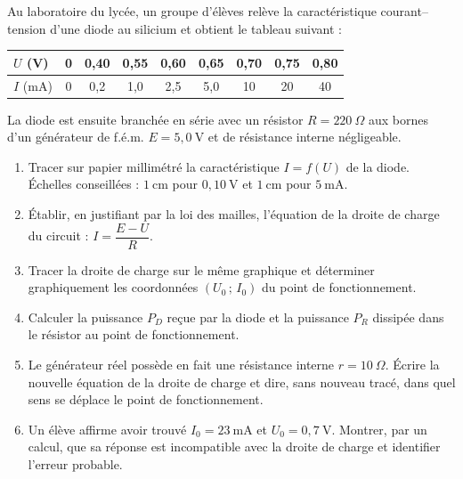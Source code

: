 \documentclass[11pt]{article}
\begin{document}
\begin{exercice}
Au laboratoire du lycée, un groupe d'élèves relève la caractéristique courant--tension d'une diode au silicium et obtient le tableau suivant :
\begin{center}
\begin{tabular}{|l|c|c|c|c|c|c|c|c|}
\hline
\rowcolor{popblueL} $U$ (V) & 0 & 0{,}40 & 0{,}55 & 0{,}60 & 0{,}65 & 0{,}70 & 0{,}75 & 0{,}80 \\
\hline
$I$ (mA) & 0 & 0{,}2 & 1{,}0 & 2{,}5 & 5{,}0 & 10 & 20 & 40 \\
\hline
\end{tabular}
\end{center}
La diode est ensuite branchée en série avec un résistor $R = 220~\Omega$ aux bornes d'un générateur de f.é.m. $E = 5{,}0~\text{V}$ et de résistance interne négligeable.
\begin{enumerate}
\item Tracer sur papier millimétré la caractéristique $I = f(U)$ de la diode. Échelles conseillées : $1~\text{cm}$ pour $0{,}10~\text{V}$ et $1~\text{cm}$ pour $5~\text{mA}$.
\item Établir, en justifiant par la loi des mailles, l'équation de la droite de charge du circuit : $I = \dfrac{E - U}{R}$.
\item Tracer la droite de charge sur le même graphique et déterminer graphiquement les coordonnées $(U_0\,;\,I_0)$ du point de fonctionnement.
\item Calculer la puissance $P_D$ reçue par la diode et la puissance $P_R$ dissipée dans le résistor au point de fonctionnement.
\item Le générateur réel possède en fait une résistance interne $r = 10~\Omega$. Écrire la nouvelle équation de la droite de charge et dire, sans nouveau tracé, dans quel sens se déplace le point de fonctionnement.
\item Un élève affirme avoir trouvé $I_0 = 23~\text{mA}$ et $U_0 = 0{,}7~\text{V}$. Montrer, par un calcul, que sa réponse est incompatible avec la droite de charge et identifier l'erreur probable.
\end{enumerate}
\end{exercice}
\end{document}
